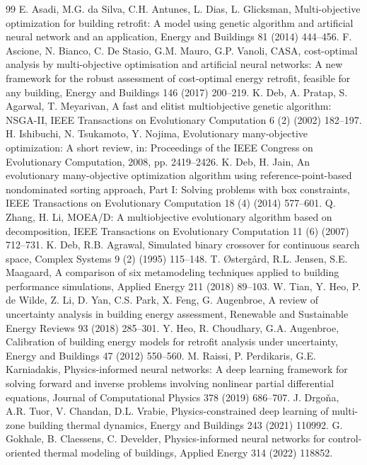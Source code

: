 \documentclass[11pt]{article}
\begin{document}
\begin{thebibliography}{99}
 E. Asadi, M.G. da Silva, C.H. Antunes, L. Dias, L. Glicksman, Multi-objective optimization for building retrofit: A model using genetic algorithm and artificial neural network and an application, Energy and Buildings 81 (2014) 444--456.
 F. Ascione, N. Bianco, C. De Stasio, G.M. Mauro, G.P. Vanoli, CASA, cost-optimal analysis by multi-objective optimisation and artificial neural networks: A new framework for the robust assessment of cost-optimal energy retrofit, feasible for any building, Energy and Buildings 146 (2017) 200--219.
 K. Deb, A. Pratap, S. Agarwal, T. Meyarivan, A fast and elitist multiobjective genetic algorithm: NSGA-II, IEEE Transactions on Evolutionary Computation 6 (2) (2002) 182--197.
 H. Ishibuchi, N. Tsukamoto, Y. Nojima, Evolutionary many-objective optimization: A short review, in: Proceedings of the IEEE Congress on Evolutionary Computation, 2008, pp. 2419--2426.
 K. Deb, H. Jain, An evolutionary many-objective optimization algorithm using reference-point-based nondominated sorting approach, Part I: Solving problems with box constraints, IEEE Transactions on Evolutionary Computation 18 (4) (2014) 577--601.
 Q. Zhang, H. Li, MOEA/D: A multiobjective evolutionary algorithm based on decomposition, IEEE Transactions on Evolutionary Computation 11 (6) (2007) 712--731.
 K. Deb, R.B. Agrawal, Simulated binary crossover for continuous search space, Complex Systems 9 (2) (1995) 115--148.
 T. \O{}sterg\aa{}rd, R.L. Jensen, S.E. Maagaard, A comparison of six metamodeling techniques applied to building performance simulations, Applied Energy 211 (2018) 89--103.
 W. Tian, Y. Heo, P. de Wilde, Z. Li, D. Yan, C.S. Park, X. Feng, G. Augenbroe, A review of uncertainty analysis in building energy assessment, Renewable and Sustainable Energy Reviews 93 (2018) 285--301.
 Y. Heo, R. Choudhary, G.A. Augenbroe, Calibration of building energy models for retrofit analysis under uncertainty, Energy and Buildings 47 (2012) 550--560.
 M. Raissi, P. Perdikaris, G.E. Karniadakis, Physics-informed neural networks: A deep learning framework for solving forward and inverse problems involving nonlinear partial differential equations, Journal of Computational Physics 378 (2019) 686--707.
 J. Drgo\v{n}a, A.R. Tuor, V. Chandan, D.L. Vrabie, Physics-constrained deep learning of multi-zone building thermal dynamics, Energy and Buildings 243 (2021) 110992.
 G. Gokhale, B. Claessens, C. Develder, Physics-informed neural networks for control-oriented thermal modeling of buildings, Applied Energy 314 (2022) 118852.

\end{thebibliography}
\end{document}
